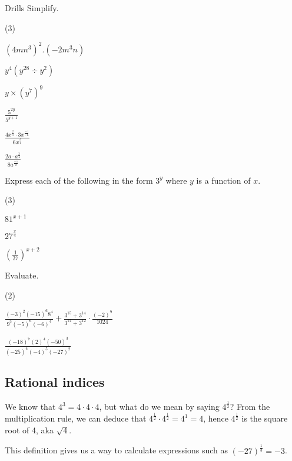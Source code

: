 \begin{questions}{Drills}
Simplify.
\begin{question_set}(3)
    \item $\left(4mn^{3}\right)^{2}.\left(-2m^{3}n\right)$
    \item $y^{4}\left(y^{28} \div y^{2}\right)$
    \item $y \times \left(y^{7}\right)^{9}$
    \item $\frac{5^{2y}}{5^{y+1}}$
    \item $\frac{4x^{\frac{2}{3}} \cdot 3x^\frac{-1}{-6}}{6x^{\frac{3}{4}}}$
    \item $\frac{2a \cdot a^{\frac{3}{4}}}{8a^\frac{-1}{2}}$ %
\end{question_set}

Express each of the following in the form $3^{y}$ where $y$ is a function of $x$.
\begin{question_set}(3)
    \item $81^{x+1}$
    \item $27^{\frac{x}{4}}$
    \item $\left(\frac{1}{27}\right)^{x+2}$
\end{question_set}

Evaluate.
\begin{question_set}(2)
    \item $\frac{(-3)^{2}(-15)^{6}8^{4}}{9^{2}(-5)^{6}(-6)^{4}}+\frac{3^{15}+3^{14}}{3^{14}+3^{12}} \cdot \frac{(-2)^{9}}{1024}$
    \item $\frac{(-18)^{7}(2)^{4}(-50)^{3}}{(-25)^{4}(-4)^{5}(-27)^{2}}$
\end{question_set}
\end{questions}

\subsection{Rational indices}
We know that $4^{3}=4 \cdot 4 \cdot 4$, but what do we mean by saying $4^{\frac{1}{2}}$?
From the multiplication rule, we can deduce that $4^{\frac{1}{2}} \cdot 4^{\frac{1}{2}}=4^{1}=4$, hence $4^{\frac{1}{2}}$ is the square root of 4, aka $\sqrt{4}$.

This definition gives us a way to calculate expressions such as $(-27)^{\frac{1}{3}}=-3$. %

